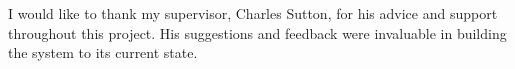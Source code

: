 \begin{acknowledgements}
I would like to thank my supervisor, Charles Sutton, for his advice and support throughout this project. His suggestions and feedback were invaluable in building the system to its current state.
\end{acknowledgements}